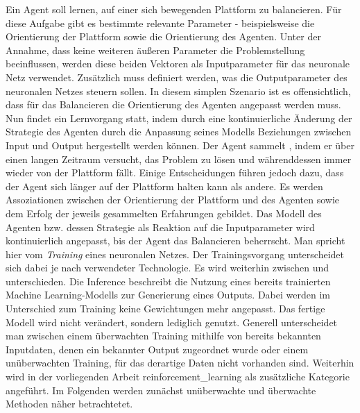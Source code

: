 Ein Agent soll lernen, auf einer sich bewegenden Plattform zu balancieren. Für diese Aufgabe gibt es bestimmte relevante Parameter - beispielsweise die Orientierung der Plattform sowie die Orientierung des Agenten. Unter der Annahme, dass keine weiteren äußeren Parameter die Problemstellung beeinflussen, werden diese beiden Vektoren als Inputparameter für das neuronale Netz verwendet. Zusätzlich muss definiert werden, was die Outputparameter des neuronalen Netzes steuern sollen. In diesem simplen Szenario ist es offensichtlich, dass für das Balancieren die Orientierung des Agenten angepasst werden muss.
Nun findet ein Lernvorgang statt, indem durch eine kontinuierliche Änderung der Strategie des Agenten durch die Anpassung seines Modells Beziehungen zwischen Input und Output hergestellt werden können. Der Agent sammelt , indem er über einen langen Zeitraum versucht, das Problem zu lösen und währenddessen immer wieder von der Plattform fällt. Einige Entscheidungen führen jedoch dazu, dass der Agent sich länger auf der Plattform halten kann als andere. Es werden Assoziationen zwischen der Orientierung der Plattform und des Agenten sowie dem Erfolg der jeweils gesammelten Erfahrungen gebildet. Das Modell des Agenten bzw. dessen Strategie als Reaktion auf die Inputparameter wird kontinuierlich angepasst, bis der Agent das Balancieren beherrscht.
Man spricht hier vom \textit{Training} eines neuronalen Netzes. Der Trainingsvorgang unterscheidet sich dabei je nach verwendeter Technologie. Es wird weiterhin zwischen  und  unterschieden. Die Inference beschreibt die Nutzung eines bereits trainierten Machine Learning-Modells zur Generierung eines Outputs. Dabei werden im Unterschied zum Training keine Gewichtungen mehr angepasst. Das fertige Modell wird nicht verändert, sondern lediglich genutzt.
Generell unterscheidet man zwischen einem überwachten Training mithilfe von bereits bekannten Inputdaten, denen ein bekannter Output zugeordnet wurde oder einem unüberwachten Training, für das derartige Daten nicht vorhanden sind. Weiterhin wird in der vorliegenden Arbeit \ac{reinforcement_learning} als zusätzliche Kategorie angeführt. Im Folgenden werden zunächst unüberwachte und überwachte Methoden näher betrachtetet.



